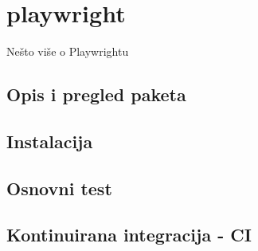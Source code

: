 \chapter{playwright}\label{ch_playwright}
Nešto više o Playwrightu

\section{Opis i pregled paketa}

\section{Instalacija}

\section{Osnovni test}

\section{Kontinuirana integracija - CI}
